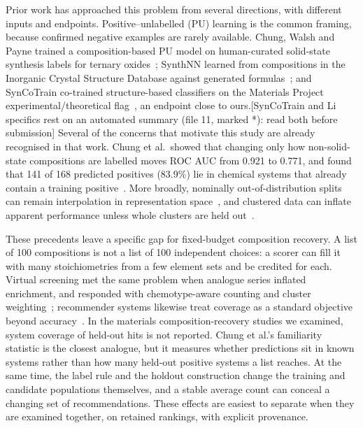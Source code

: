 \documentclass[11pt,a4paper]{article}
\newif\ifshownotes\shownotestrue
\newcommand{\authornote}[1]{\ifshownotes{\color{red!70!black}\textsf{\small[#1]}}\fi}
\begin{document}
Prior work has approached this problem from several directions, with different inputs and endpoints. Positive--unlabelled (PU) learning is the common framing, because confirmed negative examples are rarely available. Chung, Walsh and Payne trained a composition-based PU model on human-curated solid-state synthesis labels for ternary oxides~\citep{chung2025}; SynthNN learned from compositions in the Inorganic Crystal Structure Database against generated formulas~\citep{antoniuk2023}; and SynCoTrain co-trained structure-based classifiers on the Materials Project experimental/theoretical flag~\citep{amariamir2025}, an endpoint close to ours.\authornote{SynCoTrain and Li specifics rest on an automated summary (file 11, marked *): read both before submission} Several of the concerns that motivate this study are already recognised in that work. Chung et al.\ showed that changing only how non-solid-state compositions are labelled moves ROC AUC from 0.921 to 0.771, and found that 141 of 168 predicted positives (83.9\%) lie in chemical systems that already contain a training positive~\citep{chung2025}. More broadly, nominally out-of-distribution splits can remain interpolation in representation space~\citep{li2025}, and clustered data can inflate apparent performance unless whole clusters are held out~\citep{meredig2018}.

These precedents leave a specific gap for fixed-budget composition recovery. A list of 100 compositions is not a list of 100 independent choices: a scorer can fill it with many stoichiometries from a few element sets and be credited for each. Virtual screening met the same problem when analogue series inflated enrichment, and responded with chemotype-aware counting and cluster weighting~\citep{mackey2009,clark2008}; recommender systems likewise treat coverage as a standard objective beyond accuracy~\citep{kaminskas2016}. In the materials composition-recovery studies we examined, system coverage of held-out hits is not reported. Chung et al.'s familiarity statistic is the closest analogue, but it measures whether predictions sit in known systems rather than how many held-out positive systems a list reaches. At the same time, the label rule and the holdout construction change the training and candidate populations themselves, and a stable average count can conceal a changing set of recommendations. These effects are easiest to separate when they are examined together, on retained rankings, with explicit provenance.
\end{document}
